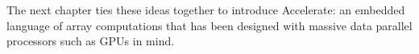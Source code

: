 The next chapter ties these ideas together to introduce Accelerate: an embedded
language of array computations that has been designed with massive data parallel
processors such as GPUs in mind.


%
%
%
%
%
%
%


